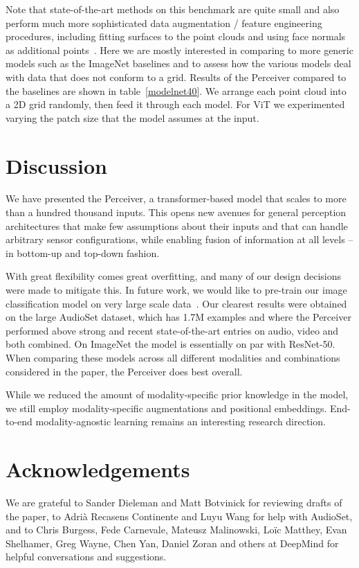 \documentclass{article}
\begin{document}
Note that state-of-the-art methods on this benchmark are quite small and also perform much more sophisticated data augmentation / feature engineering procedures, including fitting surfaces to the point clouds and using face normals as additional points~\cite{qi2017pointnet++}. Here we are mostly interested in comparing to more generic models such as the ImageNet baselines and to assess how the various models deal with data that does not conform to a grid. Results of the Perceiver compared to the baselines are shown in table~\ref{modelnet40}. We arrange each point cloud into a 2D grid randomly, then feed it through each model. For ViT we experimented varying the patch size that the model assumes at the input.

\section{Discussion}

We have presented the Perceiver, a transformer-based model that scales to more than a hundred thousand inputs. This opens new avenues for general perception architectures that make few assumptions about their inputs and that can handle arbitrary sensor configurations, while enabling fusion of information at all levels -- in bottom-up and top-down fashion.

With great flexibility comes great overfitting, and many of our design decisions were made to mitigate this. In future work, we would like to pre-train our image classification model on very large scale data~\cite{dosovitskiy2020image}. Our clearest results were obtained on the large AudioSet dataset, which has 1.7M examples and where the Perceiver performed above strong and recent state-of-the-art entries on audio, video and both combined. On ImageNet the model is essentially on par with ResNet-50. When comparing these models across all different modalities and combinations considered in the paper, the Perceiver does best overall. 

While we reduced the amount of modality-specific prior knowledge in the model, we still employ modality-specific augmentations and positional embeddings. End-to-end modality-agnostic learning remains an interesting research direction. 

\section*{Acknowledgements}

We are grateful to Sander Dieleman and Matt Botvinick for reviewing drafts of the paper, to Adri\`{a} Recasens Continente and Luyu Wang for help with AudioSet, and to Chris Burgess, Fede Carnevale, Mateusz Malinowski, Lo\"{i}c Matthey, Evan Shelhamer, Greg Wayne, Chen Yan, Daniel Zoran and others at DeepMind for helpful conversations and suggestions.
\end{document}
